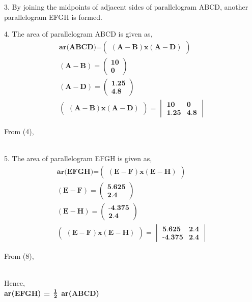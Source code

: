 \documentclass[a4paper,12pt]{report}
\newcommand{\myvec}[1]{\ensuremath{\begin{pmatrix}#1\end{pmatrix}}}
\let\vec\mathbf
\newcommand{\mydet}[1]{\ensuremath{\begin{vmatrix}#1\end{vmatrix}}}
\begin{document}
\begin{multicols}{2}
\raggedright\large{3. By joining the midpoints of adjacent sides of parallelogram ABCD, another parallelogram EFGH is formed.}\vspace{2mm}\\
\raggedright\large{4. The area of parallelogram ABCD is given as,}\\
\begin{align} \textbf{ar(ABCD)=}\myvec{\vec{(A-B)x(A-D)}}\\
	\vec{(A-B)} = \myvec{\textbf{10}\\\textbf{0}}\\
		      \vec{(A-D)} = \myvec{\textbf{1.25}\\\textbf{4.8}}\\ 
		      \myvec{\vec{(A-B)x(A-D)}} = \mydet{\textbf{10}&\textbf{0}\\\textbf{1.25}&\textbf{4.8}}
\end{align}
\raggedright{From (4),}\\\vspace{5mm}\\
\raggedright\large{5. The area of parallelogram EFGH is given as,}\\
\begin{align} \textbf{ar(EFGH)=}\myvec{\vec{(E-F)x(E-H)}}\\
	\vec{(E-F)} = \myvec{\textbf{5.625}\\\textbf{2.4}}\\
		      \vec{(E-H)} = \myvec{\textbf{-4.375}\\\textbf{2.4}}\\
		      \myvec{\vec{(E-F)x(E-H)}} = \mydet{\textbf{5.625}&\textbf{2.4}\\\textbf{-4.375}&\textbf{2.4}}
\end{align}
\raggedright{From (8),}\\\vspace{5mm}\\
\raggedright\large{Hence,}\vspace{2mm}\\
\centering\textbf{ar(EFGH) = $\frac{\textbf 1}{\textbf 2}$ ar(ABCD)}\vspace{2mm}\\

\end{multicols}
\end{document}
